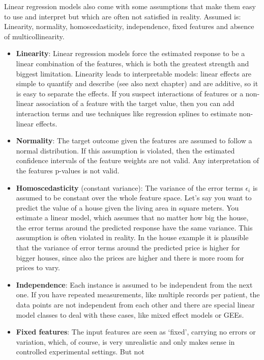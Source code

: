 \documentclass[12pt,]{krantz}
\providecommand{\tightlist}{%
  \setlength{\itemsep}{0pt}\setlength{\parskip}{0pt}}
\theoremstyle{definition}
\theoremstyle{definition}
\theoremstyle{definition}
\theoremstyle{remark}
\begin{document}
Linear regression models also come with some assumptions that make them
easy to use and interpret but which are often not satisfied in reality.
Assumed is: Linearity, normality, homoscedasticity, independence, fixed
features and absence of multicollinearity.

\begin{itemize}
\tightlist
\item
  \textbf{Linearity}: Linear regression models force the estimated
  response to be a linear combination of the features, which is both the
  greatest strength and biggest limitation. Linearity leads to
  interpretable models: linear effects are simple to quantify and
  describe (see also next chapter) and are additive, so it is easy to
  separate the effects. If you suspect interactions of features or a
  non-linear association of a feature with the target value, then you
  can add interaction terms and use techniques like regression splines
  to estimate non-linear effects.
\item
  \textbf{Normality}: The target outcome given the features are assumed
  to follow a normal distribution. If this assumption is violated, then
  the estimated confidence intervals of the feature weights are not
  valid. Any interpretation of the features p-values is not valid.
\item
  \textbf{Homoscedasticity} (constant variance): The variance of the
  error terms \(\epsilon_{i}\) is assumed to be constant over the whole
  feature space. Let's say you want to predict the value of a house
  given the living area in square meters. You estimate a linear model,
  which assumes that no matter how big the house, the error terms around
  the predicted response have the same variance. This assumption is
  often violated in reality. In the house example it is plausible that
  the variance of error terms around the predicted price is higher for
  bigger houses, since also the prices are higher and there is more room
  for prices to vary.
\item
  \textbf{Independence}: Each instance is assumed to be independent from
  the next one. If you have repeated measurements, like multiple records
  per patient, the data points are not independent from each other and
  there are special linear model classes to deal with these cases, like
  mixed effect models or GEEs.
\item
  \textbf{Fixed features}: The input features are seen as `fixed',
  carrying no errors or variation, which, of course, is very unrealistic
  and only makes sense in controlled experimental settings. But not

\end{itemize}
\end{document}
